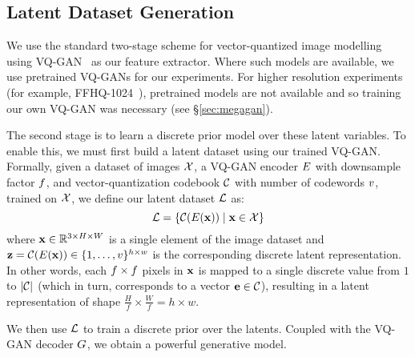 
\subsection{Latent Dataset Generation}
We use the standard two-stage scheme for vector-quantized image
modelling~\cite{oord2018neural,razavi2019generating,esser2021taming,bondtaylor2021unleashing} using
VQ-GAN~\cite{esser2021taming} as our feature extractor. Where such models are
available, we use pretrained VQ-GANs for our experiments. For higher resolution
experiments (for example, FFHQ-1024~\cite{karras2019stylebased}), pretrained
models are not available and so training our own VQ-GAN was necessary (see
\S\ref{sec:megagan}).

The second stage is to learn a discrete prior model over these latent variables.
To enable this, we must first build a latent dataset using our trained VQ-GAN.
Formally, given a dataset of images $\mathcal{X}$, a VQ-GAN encoder
$E$ with downsample factor $f$, and
vector-quantization codebook $\mathcal{C}$ with number of codewords
$v$, trained on $\mathcal{X}$, we define our latent dataset
$\mathcal{L}$ as:
\begin{equation}
    \mathcal{L} = \{\mathcal{C}(E(\mathbf{x})) \mid \mathbf{x} \in \mathcal{X} \}
\end{equation}
where $\mathbf{x} \in \mathbb{R}^{3 \times H \times W}$ is a single element of the image
dataset and $\mathbf{z} = \mathcal{C}(E(\mathbf{x})) \in \{1, \dots,
v\}^{h \times w}$ is the corresponding discrete latent
representation. In other words, each $f \times f$
pixels in $\mathbf{x}$ is mapped to a single discrete value from $1$ to
$|\mathcal{C}|$ (which in turn, corresponds to a vector $\mathbf{e} \in
\mathcal{C}$),
resulting in a latent representation of shape $\frac{H}{f} \times \frac{W}{f} =
h \times w$.

We then use $\mathcal{L}$ to train a discrete prior over the latents. Coupled
with the VQ-GAN decoder $G$, we obtain a powerful generative model. 

